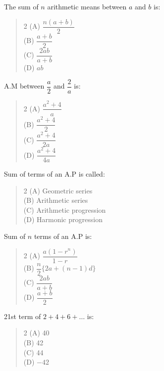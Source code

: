 \documentclass[11pt,a4paper]{article}
\begin{document}
\begin{mcqlist}
\item The sum of $n$ arithmetic means between $a$ and $b$ is:
\begin{quote}\begin{multicols}{2}
\noindent (A) $\dfrac{n(a+b)}{2}$ \\
(B) $\dfrac{a+b}{2}$ \\
(C) $\dfrac{2ab}{a+b}$ \\
(D) $ab$
\end{multicols}\end{quote}

\item A.M between $\dfrac{a}{2}$ and $\dfrac{2}{a}$ is:
\begin{quote}\begin{multicols}{2}
\noindent (A) $\dfrac{a^2+4}{a}$ \\
(B) $\dfrac{a^2+4}{2}$ \\
(C) $\dfrac{a^2+4}{2a}$ \\
(D) $\dfrac{a^2+4}{4a}$
\end{multicols}\end{quote}

\item Sum of terms of an A.P is called:
\begin{quote}\begin{multicols}{2}
\noindent (A) Geometric series \\
(B) Arithmetic series \\
(C) Arithmetic progression \\
(D) Harmonic progression
\end{multicols}\end{quote}

\item Sum of $n$ terms of an A.P is:
\begin{quote}\begin{multicols}{2}
\noindent (A) $\dfrac{a(1-r^n)}{1-r}$ \\
(B) $\dfrac{n}{2}\{2a+(n-1)d\}$ \\
(C) $\dfrac{2ab}{a+b}$ \\
(D) $\dfrac{a+b}{2}$
\end{multicols}\end{quote}

\item 21st term of $2+4+6+\ldots$ is:
\begin{quote}\begin{multicols}{2}
\noindent (A) 40 \\
(B) 42 \\
(C) 44 \\
(D) $-42$
\end{multicols}\end{quote}


\end{mcqlist}
\end{document}
